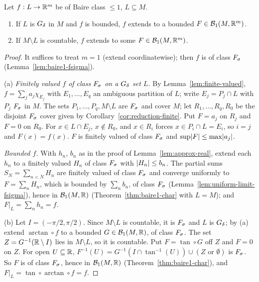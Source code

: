 \begin{theorem}\label{thm:extension}
Let $f:L\to\mathbb{R}^m$ be of Baire class $\le1$, $L\subseteq M$.
\begin{enumerate}[label=(\alph*)]
\item If $L$ is $G_\delta$ in $M$ and $f$ is bounded, $f$ extends to a bounded $F\in\mathcal B_1(M,\mathbb{R}^m)$.
\item If $M\setminus L$ is countable, $f$ extends to some $F\in\mathcal B_1(M,\mathbb{R}^m)$.
\end{enumerate}
\end{theorem}
\begin{proof}
It suffices to treat $m=1$ (extend coordinatewise); then $f$ is of class $F_\sigma$
(Lemma~\ref{lem:baire1-fsigma}).

(a) \emph{Finitely valued $f$ of class $F_\sigma$ on a $G_\delta$ set $L$.} By Lemma~\ref{lem:finite-valued}, $f=\sum_ja_j\chi_{E_j}$ with
$E_1,\dots,E_q$ an ambiguous partition of $L$; write $E_j=P_j\cap L$ with $P_j$ $F_\sigma$ in $M$. The sets
$P_1,\dots,P_q,M\setminus L$ are $F_\sigma$ and cover $M$; let $R_1,\dots,R_q,R_0$ be the disjoint $F_\sigma$
cover given by Corollary~\ref{cor:reduction-finite}. Put $F=a_j$ on $R_j$ and $F=0$ on $R_0$. For
$x\in L\cap E_j$, $x\notin R_0$, and $x\in R_i$ forces $x\in P_i\cap L=E_i$, so $i=j$ and $F(x)=f(x)$.
$F$ is finitely valued of class $F_\sigma$ and $\sup\lvert F\rvert\le\max\lvert a_j\rvert$.

\emph{Bounded $f$.} With $h_n$, $b_n$ as in the proof
of Lemma~\ref{lem:approx-real}, extend each
$h_n$ to a finitely valued $H_n$ of class $F_\sigma$ with $\lvert H_n\rvert\le b_n$. The partial sums
$S_N=\sum_{n<N}H_n$ are finitely valued of class $F_\sigma$ and converge uniformly to $F=\sum_nH_n$, which is
bounded by $\sum_nb_n$, of class $F_\sigma$ (Lemma~\ref{lem:uniform-limit-fsigma}), hence in $\mathcal B_1(M,\mathbb{R})$
(Theorem~\ref{thm:baire1-char} with $L=M$); and $F|_L=\sum_nh_n=f$.

(b) Let $I=(-\pi/2,\pi/2)$. Since $M\setminus L$ is countable, it is $F_\sigma$ and $L$ is $G_\delta$; by (a)
extend $\arctan\circ f$ to a bounded $G\in\mathcal B_1(M,\mathbb{R})$, of class $F_\sigma$. The set $Z=G^{-1}(\mathbb{R}\setminus I)$
lies in $M\setminus L$, so it is countable. Put $F=\tan\circ G$ off $Z$ and $F=0$ on $Z$. For open
$U\subseteq\mathbb{R}$, $F^{-1}(U)=G^{-1}(I\cap\tan^{-1}(U))\cup(Z\text{ or }\emptyset)$ is $F_\sigma$. So $F$ is of class
$F_\sigma$, hence in $\mathcal B_1(M,\mathbb{R})$ (Theorem~\ref{thm:baire1-char}), and $F|_L=\tan\circ\arctan\circ f=f$.
\end{proof}

